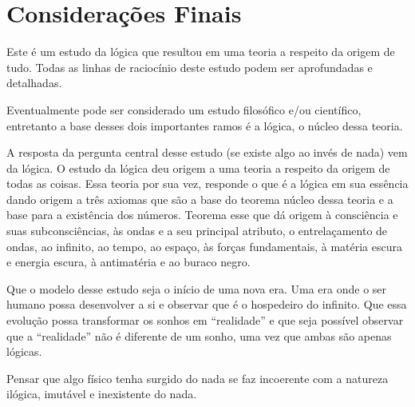 \section*{Considerações Finais}
Este é um estudo da lógica que resultou em uma teoria a respeito da origem de tudo. Todas as linhas de raciocínio deste estudo podem ser aprofundadas e detalhadas. 

Eventualmente pode ser considerado um estudo filosófico e/ou científico, entretanto a base desses dois importantes ramos é a lógica, o núcleo dessa teoria. 

A resposta da pergunta central desse estudo (se existe algo ao invés de nada) vem da lógica. O estudo da lógica deu origem a uma teoria a respeito da origem de todas as coisas. Essa teoria por sua vez, responde o que é a lógica em sua essência dando origem a três axiomas que são a base do teorema núcleo dessa teoria e a base para a existência dos números. Teorema esse que dá origem à consciência e suas subconsciências, às ondas e a seu principal atributo, o entrelaçamento de ondas, ao infinito, ao tempo, ao espaço, às forças fundamentais, à matéria escura e energia escura, à antimatéria e ao buraco negro.

Que o modelo desse estudo seja o início de uma nova era. Uma era onde o ser humano possa desenvolver a si e observar que é o hospedeiro do infinito. Que essa evolução possa transformar os sonhos em “realidade” e que seja possível observar que a “realidade” não é diferente de um sonho, uma vez que ambas são apenas lógicas.

Pensar que algo físico tenha surgido do nada se faz incoerente com a natureza ilógica, imutável e inexistente do nada.